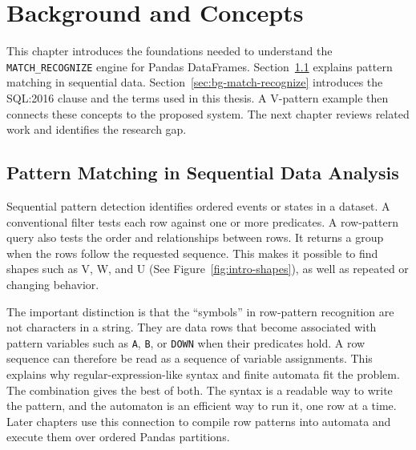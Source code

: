 \chapter{Background and Concepts}
\label{chap:background}

This chapter introduces the foundations needed to understand the
\texttt{MATCH\_RECOGNIZE} engine for Pandas DataFrames.
Section~\ref{sec:bg-pattern-matching} explains pattern matching in
sequential data.  Section~\ref{sec:bg-match-recognize} introduces the
SQL:2016 clause and the terms used in this thesis.  A V-pattern example
then connects these concepts to the proposed system.  The next chapter
reviews related work and identifies the research gap.

\section{Pattern Matching in Sequential Data Analysis}
\label{sec:bg-pattern-matching}

Sequential pattern detection identifies ordered events or states in a
dataset.  A conventional filter tests each row against one or more
predicates.  A row-pattern query also tests the order and relationships
between rows.  It returns a group when the rows follow the requested
sequence.  This makes it possible to find shapes such as V, W, and U
(See Figure~\ref{fig:intro-shapes}), as well as repeated or changing
behavior.

The important distinction is that the ``symbols'' in row-pattern
recognition are not characters in a string.  They are data rows that
become associated with pattern variables such as \texttt{A},
\texttt{B}, or \texttt{DOWN} when their predicates hold.  A row
sequence can therefore be read as a sequence of variable assignments.
This explains why regular-expression-like syntax and finite automata
fit the problem.  The combination gives the best of both.  The syntax
is a readable way to write the pattern, and the automaton is an
efficient way to run it, one row at a time.
Later chapters use this connection to compile row
patterns into automata and execute them over ordered Pandas partitions.

